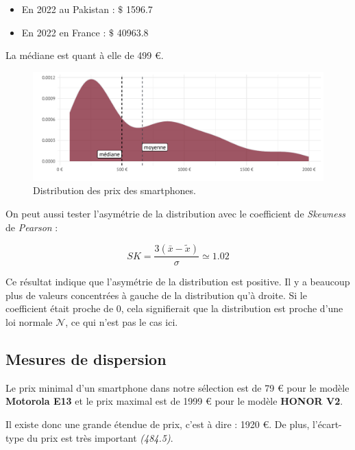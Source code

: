 \documentclass[
  12pt,
]{report}
\providecommand{\tightlist}{%
  \setlength{\itemsep}{0pt}\setlength{\parskip}{0pt}}\usepackage{longtable,booktabs,array}
\begin{document}
\begin{itemize}
\tightlist
\item
  En 2022 au Pakistan : \(\$\) 1596.7
\item
  En 2022 en France : \(\$\) 40963.8
\end{itemize}

La médiane est quant à elle de 499 €.

\begin{figure}[H]

{\centering \includegraphics{report_files/figure-pdf/density_phones-1.pdf}

}

\caption{Distribution des prix des smartphones.}

\end{figure}%

On peut aussi tester l'asymétrie de la distribution avec le coefficient
de \emph{Skewness} de \emph{Pearson} :

\[SK = \dfrac{3(\bar{x} - \tilde{x})}{\sigma} \simeq 1.02\]

Ce résultat indique que l'asymétrie de la distribution est positive. Il
y a beaucoup plus de valeurs concentrées à gauche de la distribution
qu'à droite. Si le coefficient était proche de 0, cela signifierait que
la distribution est proche d'une loi normale \(\mathcal{N}\), ce qui
n'est pas le cas ici.

\subsection{Mesures de dispersion}\label{mesures-de-dispersion}

Le prix minimal d'un smartphone dans notre sélection est de 79 € pour le
modèle \textbf{Motorola E13} et le prix maximal est de 1999 € pour le
modèle \textbf{HONOR V2}.

Il existe donc une grande étendue de prix, c'est à dire : 1920 €. De
plus, l'écart-type du prix est très important \emph{(484.5)}.
\end{document}
